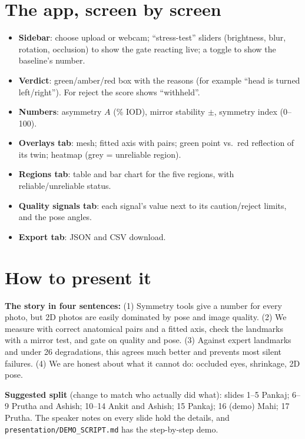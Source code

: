 \section{The app, screen by screen}
\begin{itemize}
\item \textbf{Sidebar}: choose upload or webcam; ``stress-test'' sliders (brightness, blur,
rotation, occlusion) to show the gate reacting live; a toggle to show the baseline's number.
\item \textbf{Verdict}: green/amber/red box with the reasons (for example ``head is turned
left/right''). For reject the score shows ``withheld''.
\item \textbf{Numbers}: asymmetry $A$ (\% IOD), mirror stability $\pm$, symmetry index (0--100).
\item \textbf{Overlays tab}: mesh; fitted axis with pairs; green point vs.\ red reflection of
its twin; heatmap (grey = unreliable region).
\item \textbf{Regions tab}: table and bar chart for the five regions, with reliable/unreliable status.
\item \textbf{Quality signals tab}: each signal's value next to its caution/reject limits, and the pose angles.
\item \textbf{Export tab}: JSON and CSV download.
\end{itemize}

\section{How to present it}
\textbf{The story in four sentences:}
(1) Symmetry tools give a number for every photo, but 2D photos are easily dominated by
pose and image quality. (2) We measure with correct anatomical pairs and a fitted axis, check
the landmarks with a mirror test, and gate on quality and pose. (3) Against expert landmarks and
under 26 degradations, this agrees much better and prevents most silent failures. (4) We are
honest about what it cannot do: occluded eyes, shrinkage, 2D pose.

\textbf{Suggested split} (change to match who actually did what):
slides 1--5 Pankaj; 6--9 Prutha and Ashish; 10--14 Ankit and Ashish; 15 Pankaj;
16 (demo) Mahi; 17 Prutha. The speaker notes on every slide hold the details, and
\texttt{presentation/DEMO\_SCRIPT.md} has the step-by-step demo.


